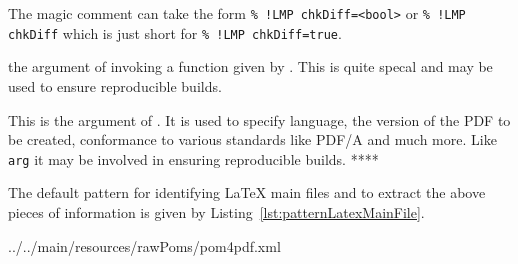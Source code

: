 \begin{description}
  The magic comment can take the form \texttt{\% !LMP chkDiff=<bool>} %
  or \texttt{\% !LMP chkDiff} %
  which is just short for \texttt{\% !LMP chkDiff=true}. %

  \item[arg] the argument of invoking a function given by . 
  This is quite specal and may be used to ensure reproducible builds. 
  \item[docMetadata] This is the argument of . 
  It is used to specify language, the version of the PDF to be created, 
  conformance to various standards like PDF/A and much more. 
  Like \texttt{arg} it may be involved in ensuring reproducible builds. **** 
\end{description}

The default pattern for identifying \LaTeX{} main files 
and to extract the above pieces of information 
is given by Listing~\ref{lst:patternLatexMainFile}. 



{../../main/resources/rawPoms/pom4pdf.xml}%


